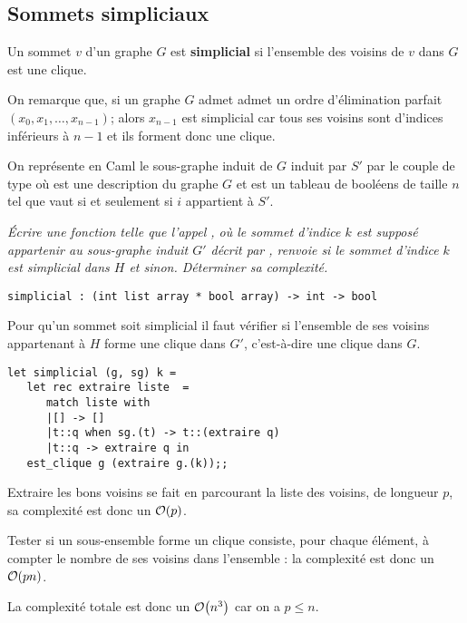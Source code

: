\subsection{Sommets simpliciaux}
Un sommet $v$ d'un graphe $G$ est {\bf simplicial} si l'ensemble
des voisins de $v$ dans $G$ est une clique.

On remarque que, si un graphe $G$ admet admet un ordre d'élimination parfait $(x_0, x_1, \ldots, x_{n-1})$; alors $x_{n-1}$ est simplicial car tous ses voisins sont d'indices inférieurs à $n-1$ et ils forment donc une clique.

\medskip

On représente en Caml le sous-graphe induit de $G$ induit par $S'$ par le couple  de type  où  est une description du graphe $G$ et
 est un tableau de booléens de taille $n$ tel que  vaut  si et seulement si $i$ appartient à $S'$.
\begin{Exercise}\it
Écrire une fonction  telle que l'appel , où le sommet d'indice $k$ est supposé  appartenir au sous-graphe induit $G'$ décrit par , renvoie  si le sommet d'indice $k$ est simplicial dans $H$ et  sinon. 
Déterminer sa complexité.
\end{Exercise}  
\begin{lstlisting}
simplicial : (int list array * bool array) -> int -> bool
\end{lstlisting}
\begin{Answer}
Pour qu'un sommet soit simplicial il faut vérifier si l'ensemble de ses voisins appartenant à $H$ forme une clique dans $G'$, c'est-à-dire une clique dans $G$.

\begin{lstlisting}
let simplicial (g, sg) k =
   let rec extraire liste  =
      match liste with
      |[] -> []
      |t::q when sg.(t) -> t::(extraire q)
      |t::q -> extraire q in
   est_clique g (extraire g.(k));;
\end{lstlisting} 
Extraire les bons voisins se fait en parcourant la liste des voisins, de longueur $p$, sa complexité est donc un ${\cal O}(p)$.

Tester si un sous-ensemble forme un clique consiste, pour chaque élément, à compter le nombre de ses voisins dans l'ensemble : la complexité est donc un ${\cal O}(pn)$.

La complexité totale est donc un ${\cal O}\bigl(n^3\bigr)$ car on a $p\le n$.
\end{Answer}

